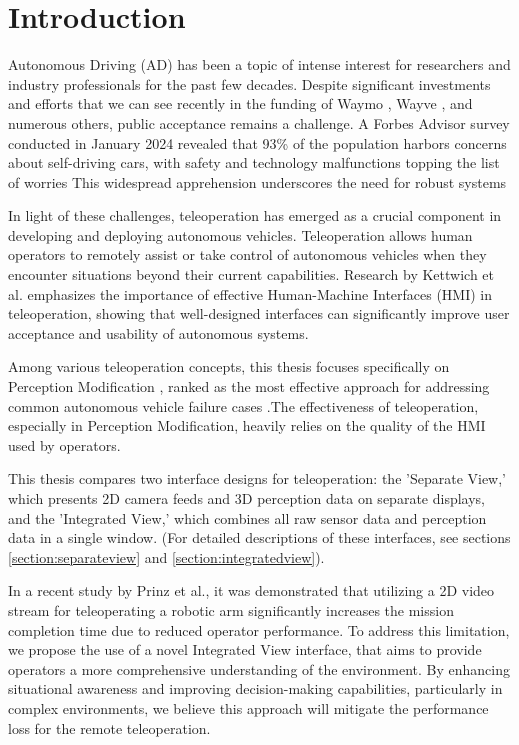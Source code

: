 
\chapter{Introduction}\label{chapter:introduction}

Autonomous Driving (AD) has been a topic of intense interest for researchers and
industry professionals for the past few decades. Despite significant investments and
efforts that we can see recently in the funding of Waymo \cite{waymo2024funding}, Wayve \cite{wayve2024funding},
and numerous others, public acceptance remains a challenge. A Forbes Advisor
survey \cite{forbes2024} conducted in January 2024 revealed that 93\% of the population harbors
concerns about self-driving cars, with safety and technology malfunctions topping the
list of worries
This widespread apprehension underscores the need for robust systems

In light of these challenges, teleoperation has emerged as a crucial component
in developing and deploying autonomous vehicles. Teleoperation allows
human operators to remotely assist or take control of autonomous vehicles when they
encounter situations beyond their current capabilities. Research by Kettwich et al. \cite{Kettwich}
emphasizes the importance of effective Human-Machine Interfaces (HMI) in
teleoperation, showing that well-designed interfaces can significantly improve user
acceptance and usability of autonomous systems.

Among various teleoperation concepts, this thesis focuses specifically on Perception Modification \cite{Feiler2021ThePM},
ranked as the most effective approach for
addressing common autonomous vehicle failure cases \cite{Brecht} .The effectiveness of
teleoperation, especially in Perception Modification, heavily relies on the quality of the HMI used by operators.

This thesis compares two interface designs for teleoperation: the 'Separate View,'
which presents 2D camera feeds and 3D perception data on separate displays, and
the 'Integrated View,' which combines all raw sensor data and perception data in a single window.
(For detailed descriptions of these interfaces, see sections \ref{section:separateview} and \ref{section:integratedview}).

In a recent study by Prinz et al.\cite{vizualizationUserStudy}, it was demonstrated that utilizing a 2D video stream for teleoperating a robotic arm
significantly increases the mission completion time due to reduced operator performance. To address this limitation,
we propose the use of a novel Integrated View interface, that aims to provide operators a more comprehensive understanding of the environment.
By enhancing situational awareness and improving decision-making capabilities, particularly in complex environments, we believe this approach
will mitigate the performance loss for the remote teleoperation.

